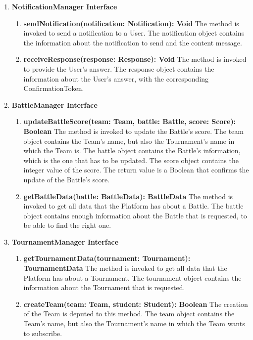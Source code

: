 \begin{enumerate}
\begin{enumerate}[label=$\bullet$]
        \end{enumerate} 
    \item \textbf{NotificationManager Interface}
        \begin{enumerate}[label=$\bullet$]
            \item \textbf{sendNotification(notification: Notification): Void} The method is invoked to send a notification to a User. The notification object contains the information about the notification to send and the content
            message.
            \item \textbf{receiveResponse(response: Response): Void} The method is invoked to provide the User's answer. The response object contains the information about the User's answer, with the corresponding ConfirmationToken.
        \end{enumerate}
    \item \textbf{BattleManager Interface}
        \begin{enumerate}[label=$\bullet$]
            \item \textbf{updateBattleScore(team: Team, battle: Battle, score: Score): Boolean} The method is invoked to update the Battle's score. The team object contains the Team's name, but also the Tournament's name in which the Team is. The battle object contains the Battle's information, which is the one that has to be updated. The score object contains the integer value of the score. The return value is a Boolean that confirms the update of the Battle's score.
            \item \textbf{getBattleData(battle: BattleData): BattleData} The method is invoked to get all data that the Platform has about a Battle. The battle object contains enough information about the Battle that is requested, to be able to find the right one.
        \end{enumerate}
    \item \textbf{TournamentManager Interface}
        \begin{enumerate}[label=$\bullet$]
            \item \textbf{getTournamentData(tournament: Tournament): TournamentData} The method is invoked to get all data that the Platform has about a Tournament. The tournament object contains the information about the Tournament that 
            is requested.
            \item \textbf{createTeam(team: Team, student: Student): Boolean} The creation of the Team is deputed to this method. The team object contains the Team's name, but also the Tournament's name in which the Team wants to subscribe. 

\end{enumerate}
\end{enumerate}
